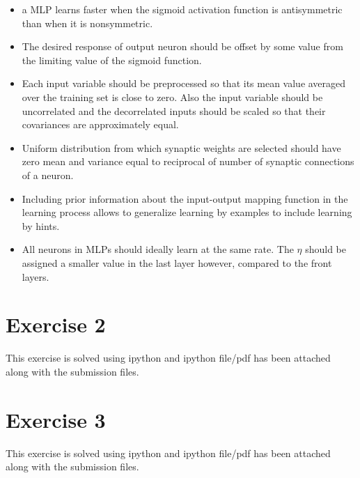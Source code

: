 \documentclass[12pt]{article}
\begin{document}
\begin{itemize}
\item a MLP learns faster when the sigmoid activation function is antisymmetric than when it is nonsymmetric.
\item The desired response of output neuron should be offset by some value from the limiting value of the sigmoid function.
\item Each input variable should be preprocessed so that its mean value averaged over the training set is close to zero. Also the input variable should be uncorrelated and the decorrelated inputs should be scaled so that their covariances are approximately equal.
\item Uniform distribution from which synaptic weights are selected should have zero mean and variance equal to reciprocal of number of synaptic connections of a neuron.
\item Including prior information about the input-output mapping function in the learning process allows to generalize learning by examples to include learning by hints.
\item All neurons in MLPs should ideally learn at the same rate. The $\eta$ should be assigned a smaller value in the last layer however, compared to the front layers.
\end{itemize}
\newpage
\section{ Exercise 2}
This exercise is solved using ipython and ipython file/pdf has been attached along with the submission files.
\section{ Exercise 3}
This exercise is solved using ipython and ipython file/pdf has been attached along with the submission files.
\end{document}
